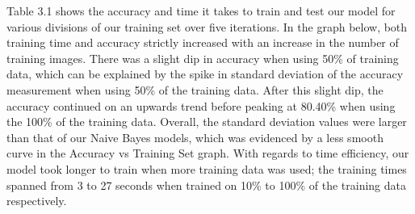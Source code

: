 \documentclass[10pt,parskip=half,
toc=sectionentrywithdots,
bibliography=totocnumbered,
captions=tableheading,numbers=noendperiod]{scrartcl}
\begin{document}
Table 3.1 shows the accuracy and time it takes to train and test our
model for various divisions of our training set over five iterations. In
the graph below, both training time and accuracy strictly increased with
an increase in the number of training images. There was a slight dip in
accuracy when using 50\% of training data, which can be explained by the
spike in standard deviation of the accuracy measurement when using 50\%
of the training data. After this slight dip, the accuracy continued on
an upwards trend before peaking at 80.40\% when using the 100\% of the
training data. Overall, the standard deviation values were larger than
that of our Naive Bayes models, which was evidenced by a less smooth
curve in the Accuracy vs Training Set graph. With regards to time
efficiency, our model took longer to train when more training data was
used; the training times spanned from 3 to 27 seconds when trained on
10\% to 100\% of the training data respectively.
\end{document}
